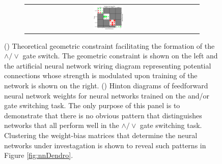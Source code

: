 \begin{figure}
\begin{center}
\begin{subfigure}[b]{0.45\linewidth}
\begin{center}
\begin{tabular}{cccc}
   & {\includegraphics[width=0.2\textwidth,page=12]{../fig/combined.pdf}}
\end{tabular}
\end{center}
\caption{}\label{fig:hintDiag}
\end{subfigure}
\end{center}
\caption{() Theoretical geometric constraint facilitating the formation of the $\wedge / \vee$ gate switch. The geometric constraint is shown on the left and the artificial neural network wiring diagram representing potential connections whose strength is modulated upon training of the network is shown on the right. () Hinton diagrams of feedforward neural network weights for neural networks trained on the and/or gate switching task. The only purpose of this panel is to demonstrate that there is no obvious pattern that distinguishes networks that all perform well in the $\wedge / \vee$ gate switching task. Clustering the weight-bias matrices that determine the neural networks under investagation is shown to reveal such patterns in Figure \ref{fig:nnDendro}.}\label{fig:neuralnets}
\end{figure}

